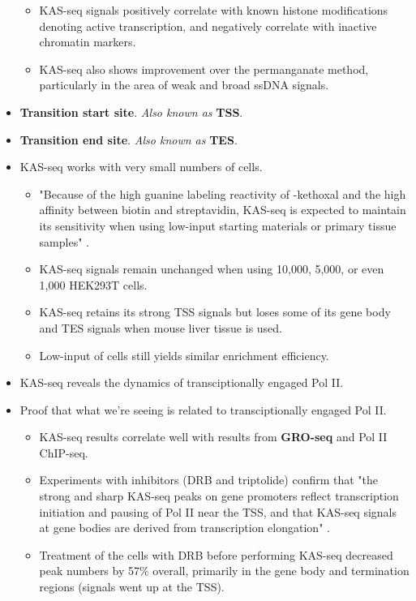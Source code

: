 \documentclass[../notes.tex]{subfiles}
\begin{document}
\begin{itemize}
\begin{itemize}
\begin{itemize}
        \end{itemize}
        \item KAS-seq signals positively correlate with known histone modifications denoting active transcription, and negatively correlate with inactive chromatin markers.
        \item KAS-seq also shows improvement over the permanganate method, particularly in the area of weak and broad ssDNA signals.
    \end{itemize}
    \item \textbf{Transition start site}. \emph{Also known as} \textbf{TSS}.
    \item \textbf{Transition end site}. \emph{Also known as} \textbf{TES}.
    \item KAS-seq works with very small numbers of cells.
    \begin{itemize}
        \item "Because of the high guanine labeling reactivity of -kethoxal and the high affinity between biotin and streptavidin, KAS-seq is expected to maintain its sensitivity when using low-input starting materials or primary tissue samples" \parencite[516]{bib:QuizReading}.
        \item KAS-seq signals remain unchanged when using 10,000, 5,000, or even 1,000 HEK293T cells.
        \item KAS-seq retains its strong TSS signals but loses some of its gene body and TES signals when mouse liver tissue is used.
        \item Low-input of cells still yields similar enrichment efficiency.
    \end{itemize}
    \item KAS-seq reveals the dynamics of transciptionally engaged Pol II.
    \item Proof that what we're seeing is related to transciptionally engaged Pol II.
    \begin{itemize}
        \item KAS-seq results correlate well with results from \textbf{GRO-seq} and Pol II ChIP-seq.
        \item Experiments with inhibitors (DRB and triptolide) confirm that "the strong and sharp KAS-seq peaks on gene promoters reflect transcription initiation and pausing of Pol II near the TSS, and that KAS-seq signals at gene bodies are derived from transcription elongation" \parencite[517]{bib:QuizReading}.
        \item Treatment of the cells with DRB before performing KAS-seq decreased peak numbers by 57\% overall, primarily in the gene body and termination regions (signals went up at the TSS).

\end{itemize}
\end{itemize}
\end{document}
